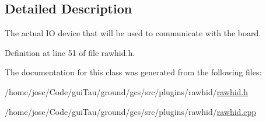\subsection{Detailed Description}
The actual I\-O device that will be used to communicate with the board. 

Definition at line 51 of file rawhid.\-h.



The documentation for this class was generated from the following files\-:\begin{DoxyCompactItemize}
\item 
/home/jose/\-Code/gui\-Tau/ground/gcs/src/plugins/rawhid/\hyperlink{rawhid_8h}{rawhid.\-h}\item 
/home/jose/\-Code/gui\-Tau/ground/gcs/src/plugins/rawhid/\hyperlink{rawhid_8cpp}{rawhid.\-cpp}\end{DoxyCompactItemize}

